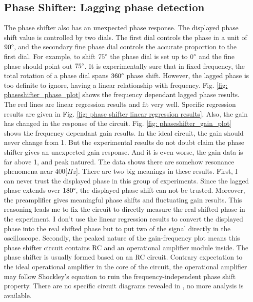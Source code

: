 \documentclass{article}
\begin{document}
\subsection{Phase Shifter: Lagging phase detection}
\label{results: phase shifter}
 The phase shifter also has an unexpected phase response.
 The displayed phase shift value is controlled by two dials.
 The first dial controls the phase in a unit of $90\degree$, and the secondary fine phase dial controls the accurate proportion to the first dial.
 For example, to shift $75\degree$ the phase dial is set up to $0\degree$ and the fine phase should point out $75\degree$.
 It is experimentally sure that in fixed frequency, the total rotation of a phase dial spans $360\degree$ phase shift.
 However, the lagged phase is too definite to ignore, having a linear relationship with frequency.
 Fig. \ref{fig: phaseshifter_phase_plot} shows the frequency dependant lagged phase results.
 The red lines are linear regression results and fit very well.
 Specific regression results are given in Fig. \ref{fig: phase shifter linear regression results}.
 Also, the gain has changed in the response of the circuit.
 Fig. \ref{fig: phaseshifter_gain_plot} shows the frequency dependant gain results.
 In the ideal circuit, the gain should never change from 1.
 But the experimental results do not doubt claim the phase shifter gives an unexpected gain response.
 And it is even worse, the gain data is far above 1, and peak natured.
 The data shows there are somehow resonance phenomena near 400[$Hz$].
 There are two big meanings in these results.
 First, I can never trust the displayed phase in this group of experiments.
 Since the lagged phase extends over $180\degree$, the displayed phase shift can not be trusted.
 Moreover, the preamplifier gives meaningful phase shifts and fluctuating gain results.
 This reasoning leads me to fix the circuit to directly measure the real shifted phase in the experiment.
 I don't use the linear regression results to convert the displayed phase into the real shifted phase but to put two of the signal directly in the oscilloscope.
 Secondly, the peaked nature of the gain-frequency plot means this phase shifter circuit contains RC and an operational amplifier module inside.
 The phase shifter is usually formed based on an RC circuit.
 Contrary expectation to the ideal operational amplifier in the core of the circuit, the operational amplifier may follow Shockley's equation to ruin the frequency-independent phase shift property.
 There are no specific circuit diagrams revealed in \cite{signal_processor}, no more analysis is available.
\end{document}
